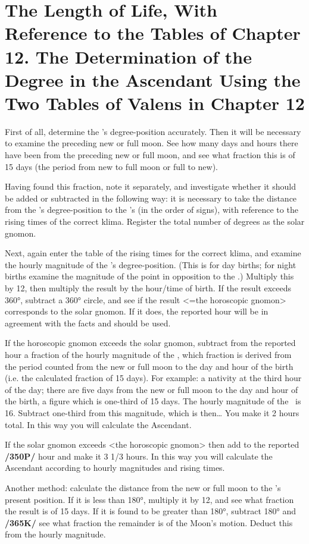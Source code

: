 \section{The Length of Life, With Reference to the Tables of Chapter 12. The Determination of the Degree in the Ascendant Using the Two Tables of Valens in Chapter 12}
First of all, determine the \Sun’s degree-position accurately. Then it will be necessary to examine the preceding new or full moon. See how many days and hours there have been from the preceding new or full
moon, and see what fraction this is of 15 days (the period from new to full moon or full to new). 

Having found this fraction, note it separately, and investigate whether it should be added or subtracted in the following way: it is necessary to take the distance from the \Sun’s degree-position to the \Moon’s (in the
order of signs), with reference to the rising times of the correct klima. Register the total number of degrees as the solar gnomon. 

Next, again enter the table of the rising times for the correct klima, and examine the hourly magnitude of the \Sun’s degree-position. (This is for day births; for night births examine the magnitude of the point in opposition to the \Sun.) Multiply this by 12, then multiply the result by the hour/time of birth. If the result exceeds 360°, subtract a 360° circle, and see if the result <=the horoscopic gnomon> corresponds to the solar gnomon. If it does, the reported hour will be in agreement with the facts and should be used. 

If the horoscopic gnomon exceeds the solar gnomon, subtract from the reported hour a fraction of the hourly magnitude of the \Sun, which fraction is derived from the period counted from the new or full moon to the day and hour of the birth (i.e. the calculated fraction of 15 days).
For example: a nativity at the third hour of the day; there are five days from the new or full moon to the day and hour of the birth, a figure which is one-third of 15 days. The hourly magnitude of the \Sun\, is
16. Subtract one-third from this magnitude, which is then… You make it 2 hours total. In this way you will calculate the Ascendant. 

If the solar gnomon exceeds <the horoscopic gnomon> then add to the
reported \textbf{/350P/} hour and make it 3 1/3 hours. In this way you will calculate the Ascendant according to hourly magnitudes and rising times.

Another method: calculate the distance from the new or full moon to the \Moon’s present position. If it is less than 180°, multiply it by 12, and see what fraction the result is of 15 days. If it is found to be greater than 180°, subtract 180° and \textbf{/365K/} see what fraction the remainder is of the Moon’s motion. Deduct this from the hourly magnitude.

